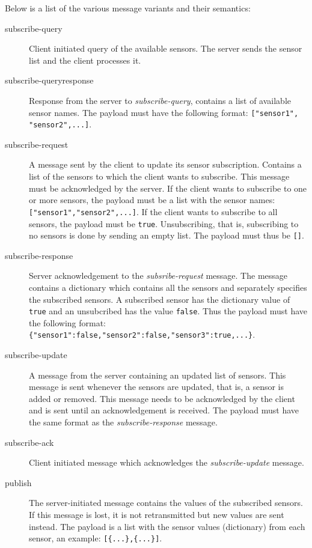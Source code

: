 \documentclass[a4paper]{article}
\begin{document}
Below is a list of the various message variants and their semantics:
\begin{description}
	\item[subscribe-query] Client initiated query of the available 
	sensors. The server sends the sensor list and the client processes it.
    
	\item[subscribe-queryresponse] Response from the server to 
	\emph{subscribe-query}, contains a list of available sensor names. 
    The payload must have the following format: \verb|["sensor1", "sensor2",...]|.
    
	\item[subscribe-request] A message sent by the client to update its sensor
	subscription. Contains a list of the sensors to which the client wants to
	subscribe. This message must be acknowledged by the server. If the client
    wants to subscribe to one or more sensors, the payload must be a list with
    the sensor names: \verb|["sensor1","sensor2",...]|. If the client wants
    to subscribe to all sensors, the payload must be \verb|true|. Unsubscribing,
    that is, subscribing to no sensors is done by sending an empty list. The
    payload must thus be \verb|[]|.
    
	\item[subscribe-response] Server acknowledgement to the 
	\emph{subsribe-request} message. The message contains a dictionary which
    contains all the sensors and separately specifies the subscribed sensors.
    A subscribed sensor has the dictionary value of \verb|true| and an unsubcribed
    has the value \verb|false|. Thus the payload must have the following format:
    \\ \verb|{"sensor1":false,"sensor2":false,"sensor3":true,...}|.
    
	\item[subscribe-update] A message from the server containing an updated
	list of sensors. This message is sent whenever the sensors are updated,
	that is, a sensor is added or removed. This message needs to be acknowledged 
	by the client and is sent until an acknowledgement is received. The payload
    must have the same format as the \emph{subscribe-response} message.
    
	\item[subscribe-ack] Client initiated message which acknowledges the 
	\emph{subscribe-update} message.
    
	\item[publish] The server-initiated message contains the values of
	the subscribed sensors. If this message is lost, it is not retransmitted but
	new values are sent instead. The payload is a list with the sensor values 
    (dictionary) from each sensor, an example: \verb|[{...},{...}]|.
    

\end{description}
\end{document}
